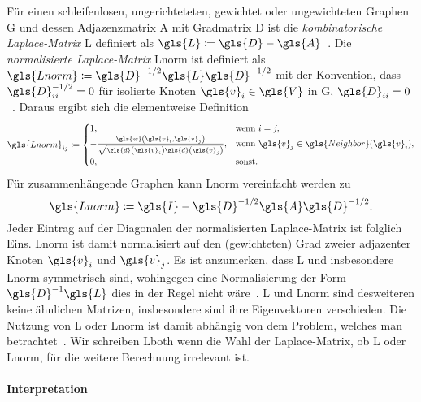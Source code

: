 Für einen schleifenlosen, ungerichteteten, gewichtet oder ungewichteten Graphen \gls{G} und dessen Adjazenzmatrix \gls{A} mit Gradmatrix \gls{D} ist die \emph{kombinatorische Laplace-Matrix} \gls{L} definiert als $\gls{L} \coloneqq \gls{D} - \gls{A}$~\cite{Chung}.
Die \emph{normalisierte Laplace-Matrix} \gls{Lnorm} ist definiert als $\gls{Lnorm} \coloneqq \gls{D}^{-1/2} \gls{L} \gls{D}^{-1/2}$ mit der Konvention, dass $\gls{D}^{-1/2}_{ii} = 0$ für isolierte Knoten $\gls{v}_i \in \gls{V}$ in \gls{G}, \dhe{} $\gls{D}_{ii} = 0$~\cite{Chung}.
Daraus ergibt sich die elementweise Definition
\begin{equation*}
  \gls{Lnorm}_{ij} \coloneqq \begin{cases}
  1, & \text{wenn }i = j,\\
    -\frac{\gls{w}\left(\gls{v}_i, \gls{v}_j\right)}{\sqrt{\gls{d}\left(\gls{v}_i\right)\gls{d}\left(\gls{v}_j\right)}}, & \text{wenn }\gls{v}_j \in \gls{Neighbor}\left(\gls{v}_i\right),\\
  0, & \text{sonst.}
\end{cases}
\end{equation*}
Für zusammenhängende Graphen kann \gls{Lnorm} vereinfacht werden zu~\cite{Chung}
\begin{equation}
  \gls{Lnorm} \coloneqq \gls{I} - \gls{D}^{-1/2} \gls{A} \gls{D}^{-1/2}.
  \label{eq:laplace_norm_connected}
\end{equation}
Jeder Eintrag auf der Diagonalen der normalisierten Laplace-Matrix ist folglich Eins.
\gls{Lnorm} ist damit normalisiert auf den (gewichteten) Grad zweier adjazenter Knoten $\gls{v}_i$ und $\gls{v}_j$.
Es ist anzumerken, dass \gls{L} und insbesondere \gls{Lnorm} symmetrisch sind, wohingegen eine Normalisierung der Form $\gls{D}^{-1}\gls{L}$ dies in der Regel nicht wäre~\cite{Reuter}.
\gls{L} und \gls{Lnorm} sind desweiteren keine ähnlichen Matrizen, insbesondere sind ihre Eigenvektoren verschieden.
Die Nutzung von \gls{L} oder \gls{Lnorm} ist damit abhängig von dem Problem, welches man betrachtet~\cite{Hammond}.
Wir schreiben \gls{Lboth} wenn die Wahl der Laplace-Matrix, ob \gls{L} oder \gls{Lnorm}, für die weitere Berechnung irrelevant ist.

\paragraph{Interpretation}
\label{laplace_interpretation}



